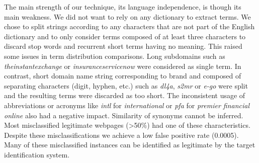 \documentclass[10pt,conference,compsocconf,letterpaper]{IEEEtran}
\begin{document}
The main strength of our technique, its language independence, is though its main weakness. 
\iffeateval
We did not want to rely on any dictionary to extract terms. 
\fi
We chose to split strings according to any characters that are not part of the English dictionary and to only consider terms composed of at least three characters to discard stop words and recurrent short terms having no meaning. This raised some issues in term distribution comparisons. Long subdomains such as \textit{theinstantexchange} or \textit{insuranceservicenow} were considered as single term. 
In contrast, short domain name string corresponding to brand and composed of separating characters (digit, hyphen, etc.) such as \textit{dl4a}, \textit{s2mr} or \textit{e-go} were split and the resulting terms were discarded as too short.
The inconsistent usage of abbreviations or acronyms like \textit{intl} for \textit{international} or \textit{pfa} for \textit{premier financial online} also had a negative impact. Similarity of synonyms cannot be inferred. Most misclassified legitimate webpages (\textgreater 50\%) had one of these characteristics. Despite these misclassifications we achieve a low false positive rate (0.0005). Many of these misclassified instances can be identified as legitimate by the target identification system.	
\end{document}
